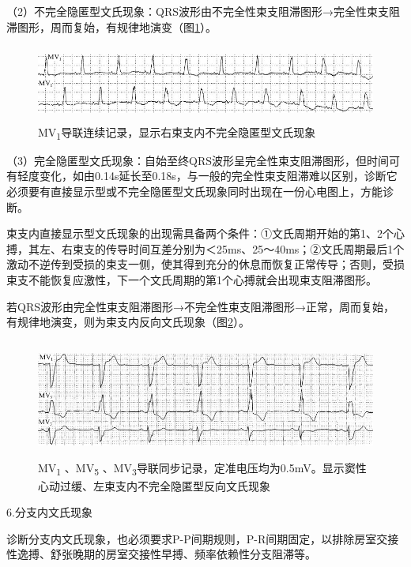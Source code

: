 （2）不完全隐匿型文氏现象：QRS波形由不完全性束支阻滞图形→完全性束支阻滞图形，周而复始，有规律地演变（图\ref{fig18-8}）。

\begin{figure}[!htbp]
 \centering
 \includegraphics[width=5.58333in,height=0.98958in]{./images/Image00309.jpg}
 \captionsetup{justification=centering}
 \caption{MV\textsubscript{1}导联连续记录，显示右束支内不完全隐匿型文氏现象}
 \label{fig18-8}
  \end{figure} 


（3）完全隐匿型文氏现象：自始至终QRS波形呈完全性束支阻滞图形，但时间可有轻度变化，如由0.14s延长至0.18s，与一般的完全性束支阻滞难以区别，诊断它必须要有直接显示型或不完全隐匿型文氏现象同时出现在一份心电图上，方能诊断。

束支内直接显示型文氏现象的出现需具备两个条件：①文氏周期开始的第1、2个心搏，其左、右束支的传导时间互差分别为＜25ms、25～40ms；②文氏周期最后1个激动不逆传到受损的束支一侧，使其得到充分的休息而恢复正常传导；否则，受损束支不能恢复应激性，下一个文氏周期的第1个心搏就会出现束支阻滞图形。

若QRS波形由完全性束支阻滞图形→不完全性束支阻滞图形→正常，周而复始，有规律地演变，则为束支内反向文氏现象（图\ref{fig18-9}）。

\begin{figure}[!htbp]
 \centering
 \includegraphics[width=5.58333in,height=1.53125in]{./images/Image00310.jpg}
 \captionsetup{justification=centering}
 \caption{MV\textsubscript{1} 、MV\textsubscript{5} 、MV\textsubscript{3}导联同步记录，定准电压均为0.5mV。显示窦性心动过缓、左束支内不完全隐匿型反向文氏现象}
 \label{fig18-9}
  \end{figure} 


6.分支内文氏现象

诊断分支内文氏现象，也必须要求P-P间期规则，P-R间期固定，以排除房室交接性逸搏、舒张晚期的房室交接性早搏、频率依赖性分支阻滞等。

